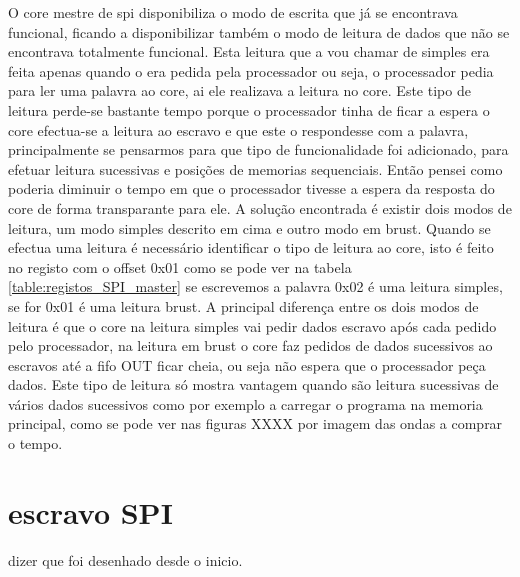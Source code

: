 O core mestre de \acrshort{spi} disponibiliza o modo de escrita que já se encontrava funcional, ficando a disponibilizar também o modo de leitura de dados que não se encontrava totalmente funcional. Esta leitura que a vou chamar de simples era feita apenas quando o era pedida pela processador ou seja, o processador pedia para ler uma palavra ao core, ai ele realizava a leitura no core. Este tipo de leitura perde-se bastante tempo porque o processador tinha de ficar a espera o core efectua-se a leitura ao escravo e que este o respondesse com a palavra, principalmente se pensarmos para que tipo de funcionalidade foi adicionado, para efetuar leitura sucessivas e posições de memorias sequenciais. Então pensei como poderia diminuir o tempo em que o processador tivesse a espera da resposta do core de forma transparante para ele. A solução encontrada é existir dois modos de leitura, um modo simples descrito em cima e outro modo em brust. Quando se efectua uma leitura é necessário identificar o tipo de leitura ao core, isto é feito no registo com o offset 0x01 como se pode ver na tabela \ref{table:registos_SPI_master} se escrevemos a palavra 0x02 é uma leitura simples, se for 0x01 é uma leitura brust. A principal diferença entre os dois modos de leitura é que o core na leitura simples vai pedir dados escravo após cada pedido pelo processador, na leitura em brust o core faz pedidos de dados sucessivos ao escravos até a \acrshort{fifo} OUT ficar cheia, ou seja não espera que o processador peça dados. Este tipo de leitura só mostra vantagem quando são leitura sucessivas de vários dados sucessivos como por exemplo a carregar o programa na memoria principal, \textcolor[rgb]{0,1,0}{como se pode ver nas figuras XXXX por imagem das ondas a comprar o tempo.}

\section{escravo SPI}

dizer que foi desenhado desde o inicio.

